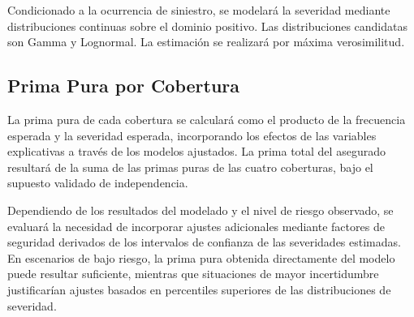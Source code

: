 \documentclass{article}
\begin{document}
Condicionado a la ocurrencia de siniestro, se modelará la severidad mediante distribuciones continuas sobre el dominio positivo. Las distribuciones candidatas son Gamma y Lognormal. La estimación se realizará por máxima verosimilitud.

\subsection{Prima Pura por Cobertura}

La prima pura de cada cobertura se calculará como el producto de la frecuencia esperada y la severidad esperada, incorporando los efectos de las variables explicativas a través de los modelos ajustados. La prima total del asegurado resultará de la suma de las primas puras de las cuatro coberturas, bajo el supuesto validado de independencia.

\medskip

Dependiendo de los resultados del modelado y el nivel de riesgo observado, se evaluará la necesidad de incorporar ajustes adicionales mediante factores de seguridad derivados de los intervalos de confianza de las severidades estimadas. En escenarios de bajo riesgo, la prima pura obtenida directamente del modelo puede resultar suficiente, mientras que situaciones de mayor incertidumbre justificarían ajustes basados en percentiles superiores de las distribuciones de severidad.
\end{document}
